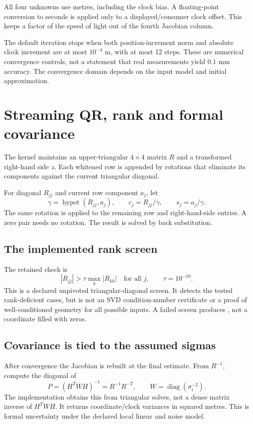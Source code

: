 All four unknowns use metres, including the clock bias. A floating-point conversion
to seconds is applied only to a displayed/consumer clock offset. This keeps a factor
of the speed of light out of the fourth Jacobian column.

The default iteration stops when both position-increment norm and absolute clock
increment are at most $10^{-4}$ m, with at most 12 steps. These are numerical
convergence controls, not a statement that real measurements yield $0.1$ mm accuracy.
The convergence domain depends on the input model and initial approximation.
\clearpage

\section{Streaming QR, rank and formal covariance}
The kernel maintains an upper-triangular $4\times4$ matrix $R$ and a transformed
right-hand side $z$. Each whitened row is appended by rotations that eliminate its
components against the current triangular diagonal.

For diagonal $R_{jj}$ and current row component $a_j$, let
\begin{equation}
\gamma=\operatorname{hypot}(R_{jj},a_j),\qquad c_j=R_{jj}/\gamma,
\qquad s_j=a_j/\gamma.
\end{equation}
The same rotation is applied to the remaining row and right-hand-side entries. A zero
pair needs no rotation. The result is solved by back substitution.

\subsection{The implemented rank screen}
The retained check is
\begin{equation}
|R_{jj}|>\tau\max_k|R_{kk}|\quad\text{for all }j,
\qquad\tau=10^{-10}.
\end{equation}
This is a declared unpivoted triangular-diagonal screen. It detects the tested
rank-deficient cases, but is not an SVD condition-number certificate or a proof of
well-conditioned geometry for all possible inputs. A failed screen produces
, not a coordinate filled with zeros. 

\subsection{Covariance is tied to the assumed sigmas}
After convergence the Jacobian is rebuilt at the final estimate. From $R^{-1}$,
compute the diagonal of
\begin{equation}
P=(H^TWH)^{-1}=R^{-1}R^{-T},\qquad
W=\operatorname{diag}(\sigma_i^{-2}).
\end{equation}
The implementation obtains this from triangular solves, not a dense matrix inverse
of $H^TWH$. It returns coordinate/clock variances in squared metres. This is formal
uncertainty under the declared local linear and noise model. 

